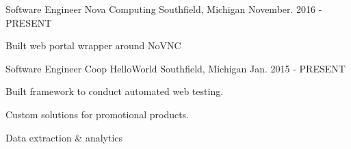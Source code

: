 

\begin{cventries}


  \cventry
    {Software Engineer} %
    {Nova Computing} %
    {Southfield, Michigan} %
    {November. 2016 - PRESENT} %
    {
      \begin{cvitems} %
        \item {Built web portal wrapper around NoVNC}
      \end{cvitems}
    }


  \cventry
    {Software Engineer Coop} %
    {HelloWorld} %
    {Southfield, Michigan} %
    {Jan. 2015 - PRESENT} %
    {
      \begin{cvitems} %
        \item {Built framework to conduct automated web testing.}
        \item {Custom solutions for promotional products.}
        \item {Data extraction \& analytics}
      \end{cvitems}
    }


\end{cventries}
